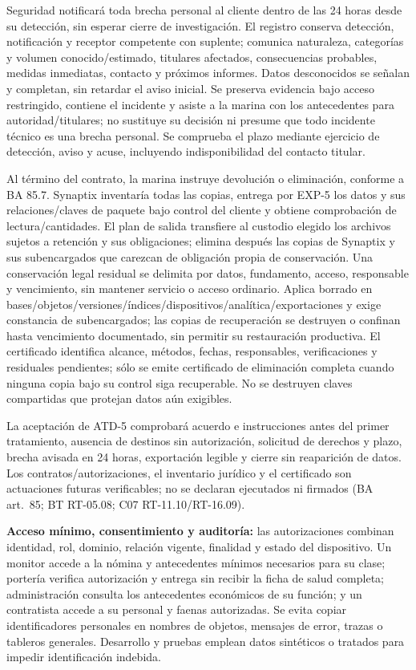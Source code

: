 Seguridad notificará toda brecha personal al cliente dentro de las 24 horas desde su detección, sin esperar cierre de investigación. El registro conserva detección, notificación y receptor competente con suplente; comunica naturaleza, categorías y volumen conocido/estimado, titulares afectados, consecuencias probables, medidas inmediatas, contacto y próximos informes. Datos desconocidos se señalan y completan, sin retardar el aviso inicial. Se preserva evidencia bajo acceso restringido, contiene el incidente y asiste a la marina con los antecedentes para autoridad/titulares; no sustituye su decisión ni presume que todo incidente técnico es una brecha personal. Se comprueba el plazo mediante ejercicio de detección, aviso y acuse, incluyendo indisponibilidad del contacto titular.

Al término del contrato, la marina instruye devolución o eliminación, conforme a BA 85.7. Synaptix inventaría todas las copias, entrega por EXP-5 los datos y sus relaciones/claves de paquete bajo control del cliente y obtiene comprobación de lectura/cantidades. El plan de salida transfiere al custodio elegido los archivos sujetos a retención y sus obligaciones; elimina después las copias de Synaptix y sus subencargados que carezcan de obligación propia de conservación. Una conservación legal residual se delimita por datos, fundamento, acceso, responsable y vencimiento, sin mantener servicio o acceso ordinario. Aplica borrado en bases/objetos/versiones/índices/dispositivos/analítica/exportaciones y exige constancia de subencargados; las copias de recuperación se destruyen o confinan hasta vencimiento documentado, sin permitir su restauración productiva. El certificado identifica alcance, métodos, fechas, responsables, verificaciones y residuales pendientes; sólo se emite certificado de eliminación completa cuando ninguna copia bajo su control siga recuperable. No se destruyen claves compartidas que protejan datos aún exigibles.

La aceptación de ATD-5 comprobará acuerdo e instrucciones antes del primer tratamiento, ausencia de destinos sin autorización, solicitud de derechos y plazo, brecha avisada en 24 horas, exportación legible y cierre sin reaparición de datos. Los contratos/autorizaciones, el inventario jurídico y el certificado son actuaciones futuras verificables; no se declaran ejecutados ni firmados (BA art.~85; BT RT-05.08; C07 RT-11.10/RT-16.09).

\textbf{Acceso mínimo, consentimiento y auditoría:} las autorizaciones combinan identidad, rol, dominio, relación vigente, finalidad y estado del dispositivo. Un monitor accede a la nómina y antecedentes mínimos necesarios para su clase; portería verifica autorización y entrega sin recibir la ficha de salud completa; administración consulta los antecedentes económicos de su función; y un contratista accede a su personal y faenas autorizadas. Se evita copiar identificadores personales en nombres de objetos, mensajes de error, trazas o tableros generales. Desarrollo y pruebas emplean datos sintéticos o tratados para impedir identificación indebida.

